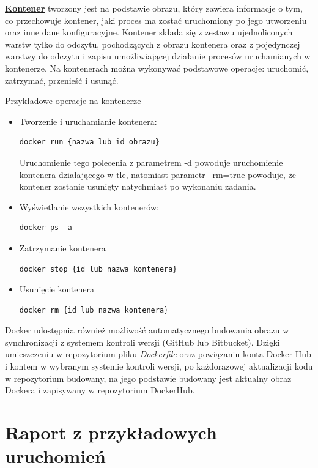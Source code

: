 	\textbf{\underline{Kontener}} tworzony jest na podstawie obrazu, który zawiera informacje o tym, co przechowuje kontener, jaki proces ma zostać uruchomiony po jego utworzeniu oraz inne dane konfiguracyjne. Kontener składa się z zestawu ujednoliconych warstw tylko do odczytu, pochodzących z obrazu kontenera oraz z pojedynczej warstwy do odczytu i zapisu umożliwiającej działanie procesów uruchamianych w kontenerze. Na kontenerach można wykonywać podstawowe operacje: uruchomić, zatrzymać, przenieść i usunąć.

Przykładowe operacje na kontenerze
\begin{itemize}
\item Tworzenie i uruchamianie kontenera:
\begin{lstlisting}[style=incode]
docker run {nazwa lub id obrazu}
\end{lstlisting}
Uruchomienie tego polecenia z parametrem -d powoduje uruchomienie kontenera działającego w tle, natomiast parametr –rm=true powoduje, że kontener zostanie usunięty natychmiast po wykonaniu zadania.
\item Wyświetlanie wszystkich kontenerów:
\begin{lstlisting}[style=incode]
docker ps -a
\end{lstlisting}
\item Zatrzymanie kontenera
\begin{lstlisting}[style=incode]
docker stop {id lub nazwa kontenera}
\end{lstlisting}
\item Usunięcie kontenera
\begin{lstlisting}[style=incode]
docker rm {id lub nazwa kontenera}
\end{lstlisting}
\end{itemize}

	Docker udostępnia również możliwość automatycznego budowania obrazu w synchronizacji z systemem kontroli wersji (GitHub lub Bitbucket). Dzięki umieszczeniu w repozytorium pliku \textit{Dockerfile} oraz powiązaniu konta Docker Hub i kontem w wybranym systemie kontroli wersji, po każdorazowej aktualizacji kodu w repozytorium budowany, na jego podstawie budowany jest aktualny obraz Dockera i zapisywany w repozytorium DockerHub.
	
	
	
	
\section{Raport z przykładowych uruchomień}

